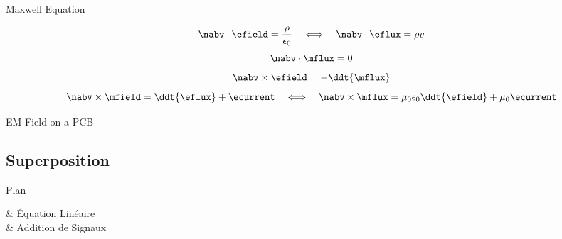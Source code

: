 \begin{frame}{Maxwell Equation}
    \begin{twocolumns}[0.3]
    \leftcol
    \rightcol
        \vspace{-8pt}
        \begin{equation}
                \nabv \cdot \efield = \frac{\rho}{\epsilon_0}
                \hspace{1em} \Longleftrightarrow \hspace{1.0em}
                \nabv \cdot \eflux = \rho v
        \end{equation}
        \vspace{-8pt}
        \begin{equation}
            \nabv \cdot \mflux = 0
        \end{equation}
        \vspace{-10pt}
        \begin{equation}
            \nabv \times \efield = -\ddt{\mflux}
        \end{equation}
        \vspace{-10pt}
        \begin{equation}
            \nabv \times \mfield = \ddt{\eflux} + \ecurrent
            \hspace{1em} \Longleftrightarrow \hspace{1.0em}
            \nabv \times \mflux = \mu_0 \epsilon_0 \ddt{\efield} + \mu_0 \ecurrent
        \end{equation}
 \end{twocolumns}
\end{frame}

\begin{frame}{EM Field on a PCB}
    \vspace{-20pt}
\end{frame}

\subsection[1min - Max]{Superposition }
\begin{frame}{Plan}
    \begin{makelist}[\small][1.5]
        \icon[red]{\faTimes} & Équation Linéaire\\
        \icon[red]{\faTimes} & Addition de Signaux
    \end{makelist}
\end{frame}

